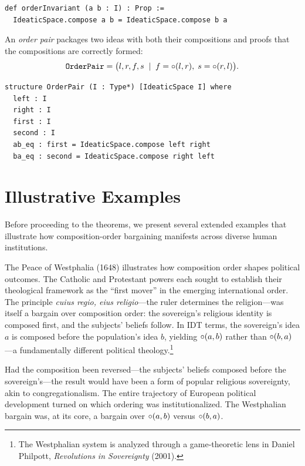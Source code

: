 \begin{lstlisting}[caption={Order invariance in Lean}]
def orderInvariant (a b : I) : Prop :=
  IdeaticSpace.compose a b = IdeaticSpace.compose b a
\end{lstlisting}

\begin{definition}
\label{def:OrderPair}
An \emph{order pair} packages two ideas with both their compositions
and proofs that the compositions are correctly formed:
\[
  \texttt{OrderPair} = \bigl(l, r, f, s \;\mid\;
    f = \circ(l, r),\; s = \circ(r, l)\bigr).
\]
\end{definition}

\begin{lstlisting}[caption={Order pair structure in Lean}]
structure OrderPair (I : Type*) [IdeaticSpace I] where
  left : I
  right : I
  first : I
  second : I
  ab_eq : first = IdeaticSpace.compose left right
  ba_eq : second = IdeaticSpace.compose right left
\end{lstlisting}

\section{Illustrative Examples}
\label{sec:ch17-examples}

Before proceeding to the theorems, we present several extended examples that
illustrate how composition-order bargaining manifests across diverse human
institutions.

\begin{example}
\label{ex:westphalia}
The Peace of Westphalia (1648) illustrates how composition order shapes
political outcomes. The Catholic and Protestant powers each sought to
establish their theological framework as the ``first mover'' in the
emerging international order. The principle \textit{cuius regio, eius
religio}---the ruler determines the religion---was itself a bargain over
composition order: the sovereign's religious identity is composed first,
and the subjects' beliefs follow. In IDT terms, the sovereign's idea $a$
is composed before the population's idea $b$, yielding $\circ(a, b)$
rather than $\circ(b, a)$---a fundamentally different political
theology.\footnote{The Westphalian system is analyzed through a
game-theoretic lens in Daniel Philpott, \textit{Revolutions in
Sovereignty} (2001).}

Had the composition been reversed---the subjects' beliefs composed before
the sovereign's---the result would have been a form of popular religious
sovereignty, akin to congregationalism.  The entire trajectory of European
political development turned on which ordering was institutionalized.
The Westphalian bargain was, at its core, a bargain over $\circ(a,b)$
versus $\circ(b,a)$.
\end{example}

